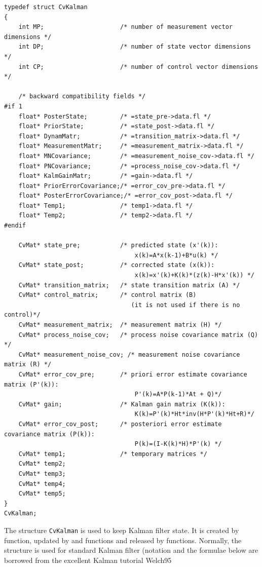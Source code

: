 \begin{lstlisting}
typedef struct CvKalman
{
    int MP;                     /* number of measurement vector dimensions */
    int DP;                     /* number of state vector dimensions */
    int CP;                     /* number of control vector dimensions */

    /* backward compatibility fields */
#if 1
    float* PosterState;         /* =state_pre->data.fl */
    float* PriorState;          /* =state_post->data.fl */
    float* DynamMatr;           /* =transition_matrix->data.fl */
    float* MeasurementMatr;     /* =measurement_matrix->data.fl */
    float* MNCovariance;        /* =measurement_noise_cov->data.fl */
    float* PNCovariance;        /* =process_noise_cov->data.fl */
    float* KalmGainMatr;        /* =gain->data.fl */
    float* PriorErrorCovariance;/* =error_cov_pre->data.fl */
    float* PosterErrorCovariance;/* =error_cov_post->data.fl */
    float* Temp1;               /* temp1->data.fl */
    float* Temp2;               /* temp2->data.fl */
#endif

    CvMat* state_pre;           /* predicted state (x'(k)):
                                    x(k)=A*x(k-1)+B*u(k) */
    CvMat* state_post;          /* corrected state (x(k)):
                                    x(k)=x'(k)+K(k)*(z(k)-H*x'(k)) */
    CvMat* transition_matrix;   /* state transition matrix (A) */
    CvMat* control_matrix;      /* control matrix (B)
                                   (it is not used if there is no control)*/
    CvMat* measurement_matrix;  /* measurement matrix (H) */
    CvMat* process_noise_cov;   /* process noise covariance matrix (Q) */
    CvMat* measurement_noise_cov; /* measurement noise covariance matrix (R) */
    CvMat* error_cov_pre;       /* priori error estimate covariance matrix (P'(k)):
                                    P'(k)=A*P(k-1)*At + Q)*/
    CvMat* gain;                /* Kalman gain matrix (K(k)):
                                    K(k)=P'(k)*Ht*inv(H*P'(k)*Ht+R)*/
    CvMat* error_cov_post;      /* posteriori error estimate covariance matrix (P(k)):
                                    P(k)=(I-K(k)*H)*P'(k) */
    CvMat* temp1;               /* temporary matrices */
    CvMat* temp2;
    CvMat* temp3;
    CvMat* temp4;
    CvMat* temp5;
}
CvKalman;
\end{lstlisting}

The structure \texttt{CvKalman} is used to keep Kalman filter
state. It is created by  function, updated
by  and  functions
and released by  functions. Normally, the
structure is used for standard Kalman filter (notation and the
formulae below are borrowed from the excellent Kalman tutorial
Welch95

